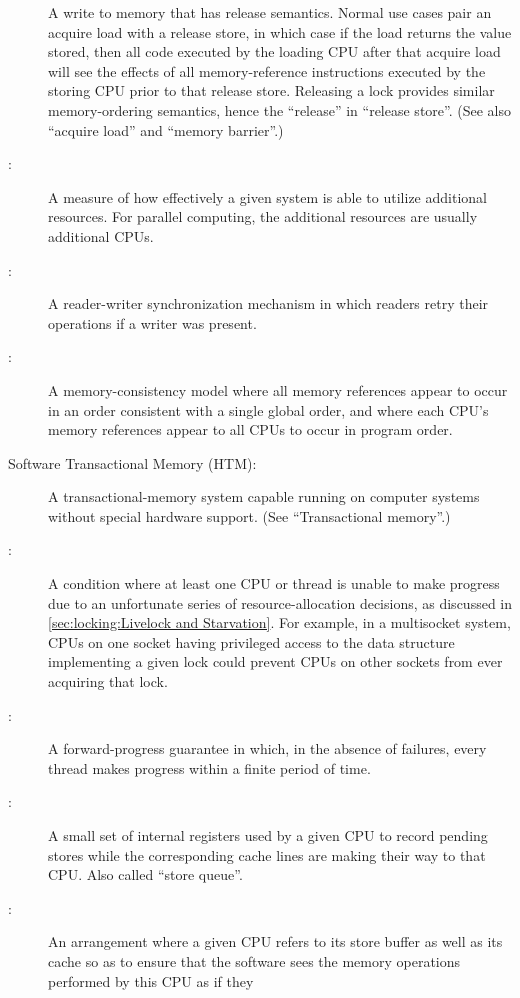 \begin{description}
	A write to memory that has release semantics.
	Normal use cases pair an acquire load with a release store,
	in which case if the load returns the value stored, then all
	code executed by the loading CPU after that acquire load will
	see the effects of all memory-reference instructions executed
	by the storing CPU prior to that release store.
	Releasing a lock provides similar memory-ordering semantics,
	hence the ``release'' in ``release store''.
	(See also ``acquire load'' and ``memory barrier''.)
\item[\IXG{Scalability}:]
	A measure of how effectively a given system is able to utilize
	additional resources.
	For parallel computing, the additional resources are usually
	additional CPUs.
\item[\IXGh{Sequence}{Lock}:]
	A reader-writer synchronization mechanism in which readers
	retry their operations if a writer was present.
\item[\IXGh{Sequential}{Consistency}:]
	A memory-consistency model where all memory references appear to occur
	in an order consistent with
	a single global order, and where each CPU's memory references
	appear to all CPUs to occur in program order.
\item[Software Transactional Memory (HTM):]
	A transactional-memory system capable running on computer systems
	without special hardware support.
	(See ``Transactional memory''.)
\item[\IXG{Starvation}:]
	A condition where at least one CPU or thread is unable to make
	progress due to an unfortunate series of resource-allocation
	decisions, as discussed in
	\cref{sec:locking:Livelock and Starvation}.
	For example, in a multisocket system, CPUs on one socket having
	privileged access to the data structure implementing a given lock
	could prevent CPUs on other sockets from ever acquiring that lock.
\item[\IXG{Starvation Free}:]
	A forward-progress guarantee in which, in the absence of
	failures, every thread makes progress within a finite
	period of time.
\item[\IXG{Store Buffer}:]
	A small set of internal registers used by a given CPU
	to record pending stores
	while the corresponding cache lines are making their
	way to that CPU\@.
	Also called ``store queue''.
\item[\IXG{Store Forwarding}:]
	An arrangement where a given CPU refers to its store buffer
	as well as its cache so as to ensure that the software sees
	the memory operations performed by this CPU as if they

\end{description}
